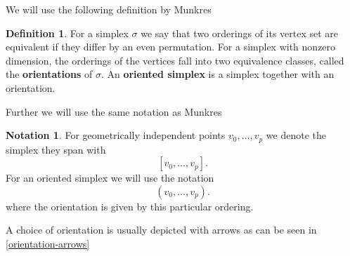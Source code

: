 \documentclass[draft]{scrartcl}
\theoremstyle{plain}
\theoremstyle{definition}
\newtheorem	{definition}[theorem]{Definition}
\newtheorem{notation}[theorem]{Notation}
\theoremstyle{remark}
\begin{document}
We will use the following definition by Munkres \cite[p. 26]{mu} %
\begin{definition}
	For a simplex $\sigma$ we say that two orderings of its vertex set are equivalent if they differ by an even permutation. For a simplex with nonzero dimension, the orderings of the vertices fall into two equivalence classes, called the \textbf{orientations} of $\sigma$. An \textbf{oriented simplex} is a simplex together with an orientation.
\end{definition}
Further we will use the same notation as Munkres \cite[p. 26]{mu}
\begin{notation}
	For geometrically independent points $v_0,\dots,v_p$ we denote the simplex they span with
	\[
	[v_0,\dots,v_p].
	\]
	For an oriented simplex we will use the notation
	\[
	(v_0,\dots,v_p).
	\]
	where the orientation is given by this particular ordering.
\end{notation}

A choice of orientation is usually depicted with arrows as can be seen in \autoref{orientation-arrows}
\end{document}
